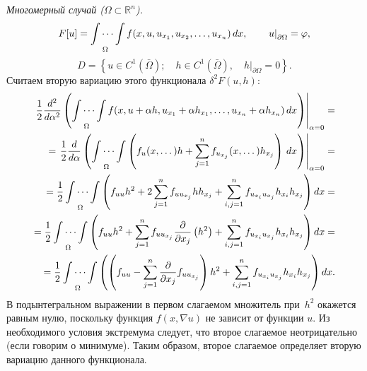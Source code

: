 \documentclass[12pt,a5paper]{book}
\begin{document}
	\vspace*{0.5em}
	\emph{Многомерный случай ($\Omega \subset \mathbb{R}^n$).}
	\begin{equation*}
		F[u] = \idotsint\limits_\Omega f(x, u, u_{x_1}, u_{x_2}, \dots, u_{x_n})\,dx, \qquad \left.u\right|_{\partial\Omega} = \varphi,
	\end{equation*}
	\begin{equation*}
		D = \left\{u \in C^1(\bar{\Omega}); \quad h \in C^1(\bar{\Omega}), \quad \left.h\right|_{\partial\Omega} = 0\right\}.
	\end{equation*}
	Считаем вторую вариацию этого функционала $\delta^2F(u,h)$:
	\begin{equation*}
		\begin{split}
			\left.\frac{1}{2}\frac{d^2}{d\alpha^2}\left(\idotsint\limits_\Omega f(x, u + \alpha h, u_{x_1} + \alpha h_{x_1}, \dots, u_{x_n} + \alpha h_{x_n})\,dx\right)\right|_{\alpha=0} = \\ = \left.\frac{1}{2}\frac{d}{d\alpha}\left(\idotsint\limits_\Omega \left( f_u(x, \dots)h + \sum_{j=1}^{n}f_{u_{x_j}}(x, \dots)h_{x_j}\right)\,dx\right)\right|_{\alpha=0} = \\ = \frac{1}{2}\idotsint\limits_\Omega\left(f_{uu}h^2 + 2\sum_{j=1}^{n}f_{uu_{x_j}}hh_{x_j} + \sum_{i,j=1}^{n}f_{u_{x_i}u_{x_j}}h_{x_i}h_{x_j}\right)dx = \\ = \frac{1}{2}\idotsint\limits_\Omega\left(f_{uu}h^2 + \sum_{j=1}^{n}f_{uu_{x_j}}\frac{\partial}{\partial x_j}\left(h^2\right) + \sum_{i,j=1}^{n}f_{u_{x_i}u_{x_j}}h_{x_i}h_{x_j}\right)dx = \\ = \frac{1}{2}\idotsint\limits_\Omega \left(\left(f_{uu} - \sum_{j=1}^{n}\frac{\partial}{\partial x_j}f_{uu_{x_j}}\right)h^2 + \sum_{i,j=1}^{n}f_{u_{x_i}u_{x_j}}h_{x_i}h_{x_j}\right)dx.
		\end{split}
	\end{equation*}
	В подынтегральном выражении в первом слагаемом множитель при~$h^2$ окажется равным нулю, поскольку функция $f(x, \nabla u)$ не зависит от функции $u$. Из необходимого условия экстремума следует, что второе слагаемое неотрицательно (если говорим о минимуме). Таким образом, второе слагаемое определяет вторую вариацию данного функционала.
	
\end{document}
